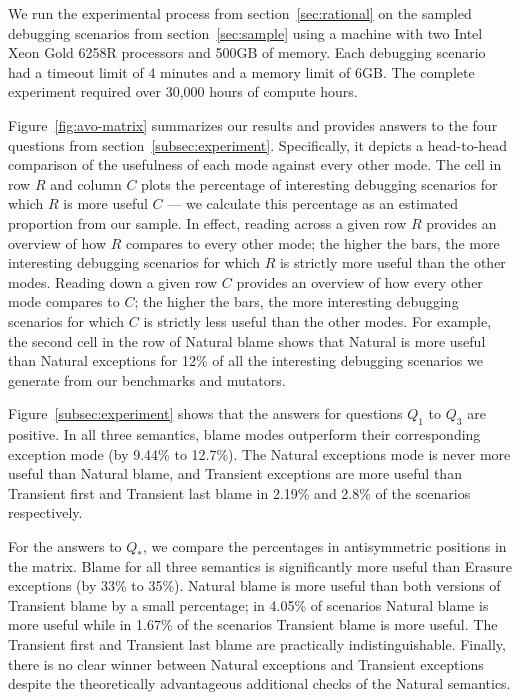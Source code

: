 We run the experimental process from section~\ref{sec:rational} on the
sampled debugging scenarios from section~\ref{sec:sample} using a machine with two Intel Xeon Gold 6258R processors and 500GB of memory.
Each debugging scenario had a timeout limit of 4 minutes and a
memory limit of 6GB. The complete experiment required
over 30,000 hours of compute hours.


Figure~\ref{fig:avo-matrix} summarizes our results and provides answers to
the four questions from section~\ref{subsec:experiment}.  Specifically, it
depicts a head-to-head comparison of the usefulness of each mode against
every other mode.  The cell in row $R$ and column $C$ plots the percentage
of interesting debugging scenarios for which $R$ is more useful $C$ ---
we calculate this percentage as an estimated proportion from our sample.
In effect, reading across a given row $R$ provides an
overview of how $R$ compares to every other mode; the higher the bars, the
more interesting debugging scenarios for which $R$ is strictly more useful
than the other modes.  Reading down a given row $C$ provides an overview
of how every other mode compares to $C$; the higher the bars, the more
interesting debugging scenarios for which $C$ is strictly less useful than
the other modes. For example, the second cell in the row of Natural blame
shows that Natural is more useful than Natural exceptions for 12\% of all
the interesting debugging scenarios we generate from our benchmarks and
mutators. 

Figure~\ref{subsec:experiment} shows that the answers for questions $Q_1$
to $Q_3$ are positive. In all three semantics, blame modes outperform
their corresponding exception mode (by 9.44\% to 12.7\%). The Natural
exceptions mode is never more useful than Natural blame, and  Transient
exceptions are more useful than Transient first and Transient last blame
in 2.19\% and 2.8\% of the scenarios respectively. 


For the answers to $Q_*$, we compare the percentages in antisymmetric
positions in the matrix. Blame for all three semantics is significantly
more useful than Erasure exceptions (by 33\% to 35\%). Natural blame is
more useful than both versions of Transient blame by a small percentage;
in 4.05\% of scenarios Natural blame is more useful while in 1.67\% of the
scenarios Transient blame is more useful. The Transient first and
Transient last blame are practically indistinguishable. Finally, there is
no clear winner between Natural exceptions and Transient exceptions
despite the theoretically advantageous additional checks of the Natural
semantics.

